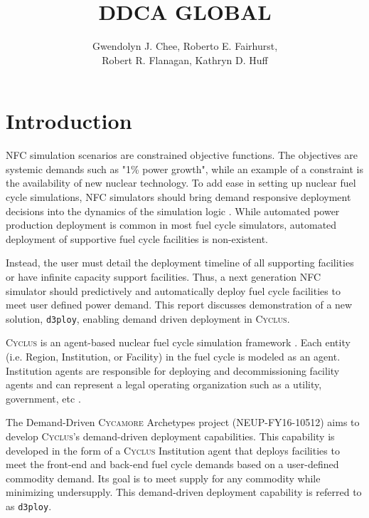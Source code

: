 \documentclass[11pt,letterpaper]{article}
\title{DDCA GLOBAL}
\author{Gwendolyn J. Chee, Roberto E. Fairhurst, 
\\ \vspace{0.5em} Robert R. Flanagan, Kathryn D. Huff}
\newcommand{\Cyclus}{\textsc{Cyclus}\xspace}%
\newcommand{\Cycamore}{\textsc{Cycamore}\xspace}%
\newcommand{\deploy}{\texttt{d3ploy}\xspace}%
\begin{document}
	\begin{titlepage}
	\maketitle
	\thispagestyle{empty}
	\end{titlepage}

\section{Introduction}
\gls{NFC} simulation scenarios are constrained objective functions. 
The objectives are systemic demands such as "1\% power growth", 
while an example of a constraint is the availability of new nuclear 
technology. 
To add ease in setting up nuclear fuel cycle simulations, \gls{NFC}
simulators should bring demand responsive deployment decisions into 
the dynamics of the simulation logic \cite{huff_current_2017}. 
While automated power production deployment is common in most fuel 
cycle simulators, automated deployment of supportive fuel cycle 
facilities is non-existent. 

Instead, the user must detail the deployment timeline of all 
supporting facilities or have infinite capacity support facilities. 
Thus, a next generation \gls{NFC} simulator should predictively and 
automatically deploy fuel cycle facilities to meet user defined 
power demand. 
This report discusses demonstration of a new solution, 
\texttt{d3ploy}, enabling demand driven deployment in \Cyclus. 

\Cyclus is an agent-based nuclear fuel cycle simulation framework 
\cite{huff_fundamental_2016}. 
Each entity (i.e. Region, Institution, or Facility) in the fuel 
cycle is modeled as an agent. 
Institution agents
are responsible for deploying and decommissioning facility agents 
and can represent a legal operating organization such as a 
utility, government, etc \cite{huff_fundamental_2016}. 

The Demand-Driven \Cycamore Archetypes project (NEUP-FY16-10512) 
aims to develop \Cyclus's demand-driven deployment capabilities. 
This capability is developed in the form of a \Cyclus Institution
agent that deploys facilities to meet the front-end and back-end 
fuel cycle demands based on a user-defined commodity demand. 
Its goal is to meet supply for any commodity while minimizing 
undersupply.
This demand-driven deployment capability is referred to as 
\deploy. 
\end{document}
